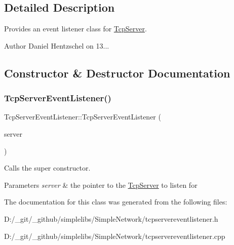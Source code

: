 \subsection{Detailed Description}
Provides an event listener class for \mbox{\hyperlink{class_tcp_server}{Tcp\+Server}}. 

\begin{DoxyAuthor}{Author}
Daniel Hentzschel on 13... 
\end{DoxyAuthor}


\subsection{Constructor \& Destructor Documentation}
\mbox{\label{class_tcp_server_event_listener_a07c2697a13038b4b12ded097e4d6aa2b}} 
\subsubsection{\texorpdfstring{TcpServerEventListener()}{TcpServerEventListener()}}
{\footnotesize\ttfamily Tcp\+Server\+Event\+Listener\+::\+Tcp\+Server\+Event\+Listener (\begin{DoxyParamCaption}\item[{\mbox{\hyperlink{class_tcp_server}{Tcp\+Server}} $\ast$}]{server }\end{DoxyParamCaption})\hspace{0.3cm}{\ttfamily [explicit]}}



Calls the super constructor. 


\begin{DoxyParams}{Parameters}
{\em server} & the pointer to the \mbox{\hyperlink{class_tcp_server}{Tcp\+Server}} to listen for \\
\hline
\end{DoxyParams}


The documentation for this class was generated from the following files\+:\begin{DoxyCompactItemize}
\item 
D\+:/\+\_\+git/\+\_\+github/simplelibs/\+Simple\+Network/tcpservereventlistener.\+h\item 
D\+:/\+\_\+git/\+\_\+github/simplelibs/\+Simple\+Network/tcpservereventlistener.\+cpp\end{DoxyCompactItemize}
